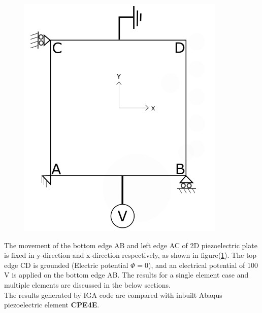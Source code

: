 \documentclass[12pt]{article}
\begin{document}
\begin{figure}[H]
\begin{minipage}{.4\textwidth}
		\includegraphics[width=1\linewidth]{PureElectrical.png}
		\label{PureElectrical}
	\end{minipage}
\end{figure}
The movement of the bottom edge AB and left edge AC of 2D piezoelectric plate is fixed in y-direction and x-direction respectively, as shown in figure(\ref{PureElectrical}).
The top edge CD is grounded (Electric potential $\Phi = 0$), and an electrical potential of 100 V  is applied on the bottom edge AB. The results for a single element case and multiple elements are discussed in the below
sections. \\
The results generated by IGA code are compared with inbuilt Abaqus piezoelectric
element \textbf{CPE4E}.

\newpage
\end{document}
